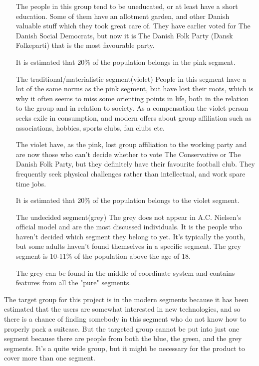 \begin{itemize}
The people in this group tend to be uneducated, or at least have a short education. Some of them have an allotment garden, and other Danish valuable stuff which they took great care of. They have earlier voted for The Danish Social Democrats, but now it is The Danish Folk Party (Dansk Folkeparti) that is the most favourable party.

It is estimated that 20\% of the population belongs in the pink segment.

\item[The traditional/materialistic segment(violet)]
People in this segment have a lot of the same norms as the pink segment, but have lost their roots, which is why it often seems to miss some orienting points in life, both in the relation to the group and in relation to society. As a compensation the violet person seeks exile in consumption, and modern offers about group affiliation such as associations, hobbies, sports clubs, fan clubs etc. 

The violet have, as the pink, lost group affiliation to the working party and are now those who can't decide whether to vote The Conservative or The Danish Folk Party, but they definitely have their favourite football club. They frequently seek physical challenges rather than intellectual, and work spare time jobs.

It is estimated that 20\% of the population belongs to the violet segment.

\item[The undecided segment(grey)]
The grey does not appear in A.C. Nielsen's official model and are the most discussed individuals. It is the people who haven't decided which segment they belong to yet. It's typically the youth, but some adults haven't found themselves in a specific segment. The grey segment is 10-11\% of the population above the age of 18.

The grey can be found in the middle of coordinate system and contains features from all the "pure" segments.
\end{itemize}
\citep{minerva}

The target group for this project is in the modern segments because it has been estimated that the users are somewhat interested in new technologies, and so there is a chance of finding somebody in this segment who do not know how to properly pack a suitcase. But the targeted group cannot be put into just one segment because there are people from both the blue, the green, and the grey segments. It's a quite wide group, but it might be necessary for the product to cover more than one segment.